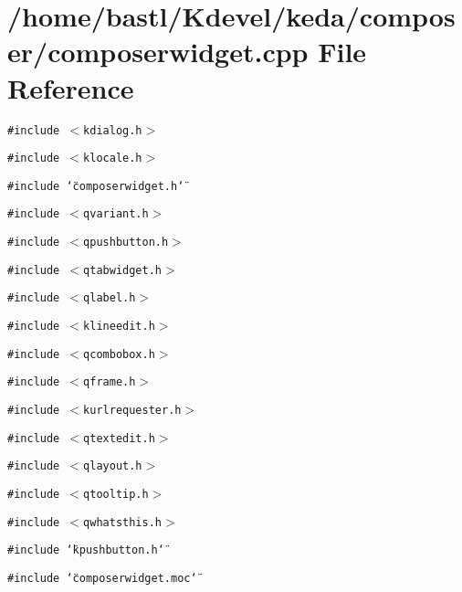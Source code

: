 \section{/home/bastl/Kdevel/keda/composer/composerwidget.cpp File Reference}
\label{composerwidget_8cpp}
{\tt \#include $<$kdialog.h$>$}\par
{\tt \#include $<$klocale.h$>$}\par
{\tt \#include \char`\"{}composerwidget.h\char`\"{}}\par
{\tt \#include $<$qvariant.h$>$}\par
{\tt \#include $<$qpushbutton.h$>$}\par
{\tt \#include $<$qtabwidget.h$>$}\par
{\tt \#include $<$qlabel.h$>$}\par
{\tt \#include $<$klineedit.h$>$}\par
{\tt \#include $<$qcombobox.h$>$}\par
{\tt \#include $<$qframe.h$>$}\par
{\tt \#include $<$kurlrequester.h$>$}\par
{\tt \#include $<$qtextedit.h$>$}\par
{\tt \#include $<$qlayout.h$>$}\par
{\tt \#include $<$qtooltip.h$>$}\par
{\tt \#include $<$qwhatsthis.h$>$}\par
{\tt \#include \char`\"{}kpushbutton.h\char`\"{}}\par
{\tt \#include \char`\"{}composerwidget.moc\char`\"{}}\par
